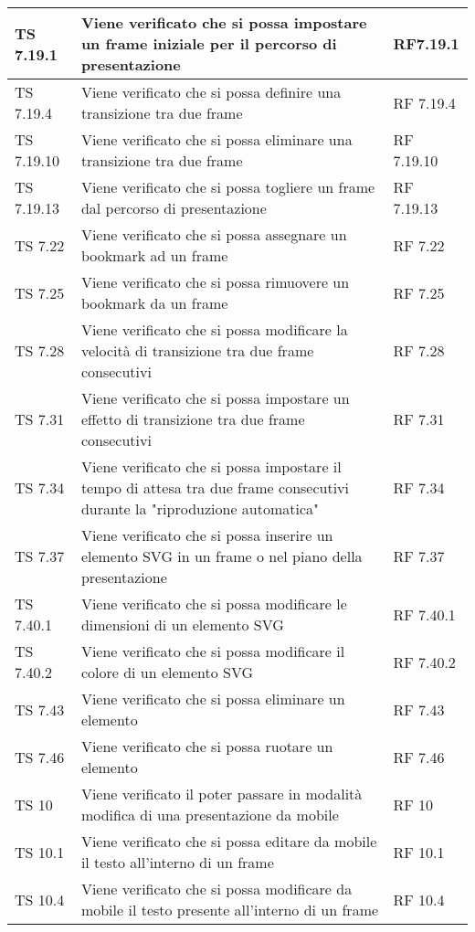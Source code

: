 {{\begin{longtable} [c]{| p{3cm} | p{6cm} |p{3cm}|}
			\hline				
			TS 7.19.1 & Viene verificato che si possa impostare un frame\ped{g} iniziale per il percorso\ped{g} di presentazione & RF7.19.1\\
			\hline
			TS 7.19.4 & Viene verificato che si possa definire una transizione tra due frame\ped{g} & RF 7.19.4\\
			\hline
			TS 7.19.10 & Viene verificato che si possa eliminare una transizione tra due frame\ped{g} & RF 7.19.10\\
			\hline
			TS 7.19.13 & Viene verificato che si possa togliere un frame\ped{g} dal percorso\ped{g} di presentazione & RF 7.19.13\\
			\hline
			TS 7.22 & Viene verificato che si possa assegnare un bookmark\ped{g} ad un frame\ped{g} & RF 7.22\\
			\hline
			TS 7.25 & Viene verificato che si possa rimuovere un bookmark\ped{g} da un frame\ped{g} & RF 7.25\\
			\hline
			TS 7.28 & Viene verificato che si possa modificare la velocità di transizione tra due frame\ped{g} consecutivi & RF 7.28\\
			\hline
			TS 7.31 & Viene verificato che si possa impostare un effetto di transizione tra due frame\ped{g} consecutivi & RF 7.31\\
			\hline
			TS 7.34 & Viene verificato che si possa impostare il tempo di attesa tra due frame\ped{g} consecutivi durante la "riproduzione automatica" & RF 7.34\\
			\hline
			TS 7.37 & Viene verificato che si possa inserire un elemento SVG in un frame o nel piano della presentazione & RF 7.37\\
			\hline
			TS 7.40.1 & Viene verificato che si possa modificare le dimensioni di un elemento SVG  & RF 7.40.1\\
			\hline
			TS 7.40.2 & Viene verificato che si possa modificare il colore di un elemento SVG  & RF 7.40.2\\
			\hline
			TS 7.43 & Viene verificato che si possa eliminare un elemento & RF 7.43 \\
			\hline
			TS 7.46 & Viene verificato che si possa ruotare un elemento & RF 7.46 \\
			\hline			 
			TS 10 & Viene verificato il poter passare in modalità modifica di una presentazione da mobile & RF 10\\
			\hline
			TS 10.1 & Viene verificato che si possa editare da mobile il testo all'interno di un frame\ped{g} & RF 10.1\\
			\hline
			TS 10.4 & Viene verificato che si possa modificare da mobile il testo presente all'interno di un frame\ped{g} & RF 10.4\\

\end{longtable}}}
